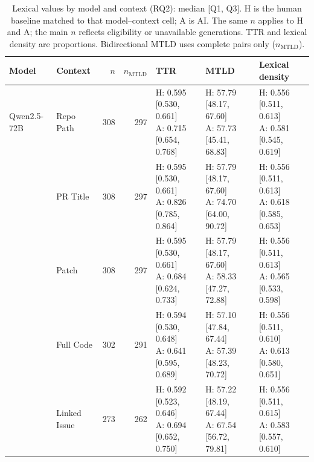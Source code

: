 \begin{table}[tp]
\centering
\caption{Lexical values by model and context (RQ2): median [Q1, Q3]. H is the human baseline matched to that model--context cell; A is AI. The same $n$ applies to H and A; the main $n$ reflects eligibility or unavailable generations. TTR and lexical density are proportions. Bidirectional MTLD uses complete pairs only ($n_{\mathrm{MTLD}}$).}
\label{tab:rq2_lexical_descriptives}
\footnotesize
\setlength{\tabcolsep}{4pt}
\renewcommand{\arraystretch}{1.08}
\begin{tabular}{llrrlll}
\toprule
\textbf{Model} & \textbf{Context} & \textbf{$n$} & \textbf{$n_{\mathrm{MTLD}}$} & \textbf{TTR} & \textbf{MTLD} & \textbf{Lexical density} \\
\midrule
Qwen2.5-72B & Repo Path & 308 & 297 & \shortstack[l]{H: 0.595 [0.530, 0.661]\\A: 0.715 [0.654, 0.768]} & \shortstack[l]{H: 57.79 [48.17, 67.60]\\A: 57.73 [45.41, 68.83]} & \shortstack[l]{H: 0.556 [0.511, 0.613]\\A: 0.581 [0.545, 0.619]} \\
 & PR Title & 308 & 297 & \shortstack[l]{H: 0.595 [0.530, 0.661]\\A: 0.826 [0.785, 0.864]} & \shortstack[l]{H: 57.79 [48.17, 67.60]\\A: 74.70 [64.00, 90.72]} & \shortstack[l]{H: 0.556 [0.511, 0.613]\\A: 0.618 [0.585, 0.653]} \\
 & Patch & 308 & 297 & \shortstack[l]{H: 0.595 [0.530, 0.661]\\A: 0.684 [0.624, 0.733]} & \shortstack[l]{H: 57.79 [48.17, 67.60]\\A: 58.33 [47.27, 72.88]} & \shortstack[l]{H: 0.556 [0.511, 0.613]\\A: 0.565 [0.533, 0.598]} \\
 & Full Code & 302 & 291 & \shortstack[l]{H: 0.594 [0.530, 0.648]\\A: 0.641 [0.595, 0.689]} & \shortstack[l]{H: 57.10 [47.84, 67.44]\\A: 57.39 [48.23, 70.72]} & \shortstack[l]{H: 0.556 [0.511, 0.610]\\A: 0.613 [0.580, 0.651]} \\
 & Linked Issue & 273 & 262 & \shortstack[l]{H: 0.592 [0.523, 0.646]\\A: 0.694 [0.652, 0.750]} & \shortstack[l]{H: 57.22 [48.19, 67.44]\\A: 67.54 [56.72, 79.81]} & \shortstack[l]{H: 0.556 [0.511, 0.615]\\A: 0.583 [0.557, 0.610]} \\

\end{tabular}
\end{table}
